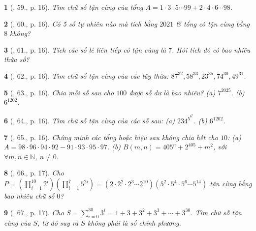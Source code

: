\documentclass{article}
\newtheorem{baitoan}{}
\begin{document}
\begin{baitoan}[\cite{Tuyen_Toan_6}, 59., p. 16]
	Tìm chữ số tận cùng của tổng $A = 1\cdot3\cdot5\cdots99 + 2\cdot4\cdot6\cdots98$.
\end{baitoan}

\begin{baitoan}[\cite{Tuyen_Toan_6}, 60., p. 16]
	Có 5 số tự nhiên nào mà tích bằng $2021$ \& tổng có tận cùng bằng $8$ không?
\end{baitoan}

\begin{baitoan}[\cite{Tuyen_Toan_6}, 61., p. 16]
	Tích các số lẻ liên tiếp có tận cùng là $7$. Hỏi tích đó có bao nhiêu thừa số?
\end{baitoan}

\begin{baitoan}[\cite{Tuyen_Toan_6}, 62., p. 16]
	Tìm chữ số tận cùng của các lũy thừa: $87^{32},58^{33},23^{35},74^{30},49^{31}$.
\end{baitoan}

\begin{baitoan}[\cite{Tuyen_Toan_6}, 63., p. 16]
	Chia mỗi số sau cho $100$ được số dư là bao nhiêu? (a) $7^{2025}$. (b) $6^{1202}$.
\end{baitoan}

\begin{baitoan}[\cite{Tuyen_Toan_6}, 64., p. 16]
	Tìm chữ số tận cùng của các số sau: (a) $234^{5^{6^7}}$. (b) $6^{1202}$.
\end{baitoan}

\begin{baitoan}[\cite{Tuyen_Toan_6}, 65., p. 16]
	Chứng minh các tổng hoặc hiệu sau không chia hết cho $10$: (a) $A = 98\cdot96\cdot94\cdot92 - 91\cdot93\cdot95\cdot97$. (b) $B(m,n) = 405^n + 2^{405} + m^2$, với $\forall m,n\in\mathbb{N}$, $n\ne0$.
\end{baitoan}

\begin{baitoan}[\cite{Tuyen_Toan_6}, 66., p. 17]
	Cho $P = \left(\prod_{i=1}^{10} 2^i\right)\left(\prod_{i=1}^7 5^{2i}\right) = (2\cdot2^2\cdot2^3\cdots2^{10})(5^2\cdot5^4\cdot5^6\cdots5^{14})$ tận cùng bằng bao nhiêu chữ số $0$?
\end{baitoan}

\begin{baitoan}[\cite{Tuyen_Toan_6}, 67., p. 17]
	Cho $S = \sum_{i=0}^{30} 3^i = 1 + 3 + 3^2 + 3^3 + \cdots + 3^{30}$. Tìm chữ số tận cùng của $S$, từ đó suy ra $S$ không phải là số chính phương.
\end{baitoan}
\end{document}
